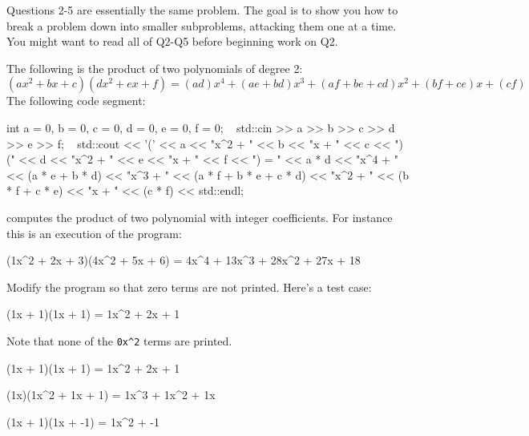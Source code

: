 Questions 2-5 are essentially the same problem. 
The goal is to show you how to break a problem down into smaller 
subproblems, attacking them one at a time. 
You might want to read all of Q2-Q5 before beginning work on Q2.

The following is the product of two polynomials of degree 2:
\[
(ax^2 + bx + c)(dx^2 + ex + f) = 
(ad)x^4 + (ae + bd)x^3 + (af + be + cd)x^2 + (bf + ce)x + (cf)
\]
The following code segment:
\begin{console}
int a = 0, b = 0, c = 0, d = 0, e = 0, f = 0;
 
std::cin >> a >> b >> c >> d >> e >> f;
 
std::cout << '('
          << a << "x^2 + "
          << b << "x + "
          << c << ")("
          << d << "x^2 + "
          << e << "x + "
          << f << ") = "
          << a * d << "x^4 + "
          << (a * e + b * d) << "x^3 + "
          << (a * f + b * e + c * d) << "x^2 + "
          << (b * f + c * e) << "x + "
          << (c * f) << std::endl;
\end{console}
computes the product of two polynomial with integer coefficients. 
For instance this is an execution of the program:
\begin{console}[commandchars=\\\{\}]
(1x^2 + 2x + 3)(4x^2 + 5x + 6) = 4x^4 + 13x^3 + 28x^2 + 27x + 18
\end{console}

Modify the program so that zero terms are not printed. 
Here's a test case:
\begin{console}[commandchars=\\\{\}]
(1x + 1)(1x + 1) = 1x^2 + 2x + 1
\end{console}
Note that none of the \verb!0x^2! terms are printed. 

\resett

\nextt
\begin{console}[commandchars=\\\{\}]
(1x + 1)(1x + 1) = 1x^2 + 2x + 1
\end{console}

\nextt
\begin{console}[commandchars=\\\{\}]
(1x)(1x^2 + 1x + 1) = 1x^3 + 1x^2 + 1x
\end{console}

\nextt
\begin{console}[commandchars=\\\{\}]
(1x + 1)(1x + -1) = 1x^2 + -1
\end{console}

